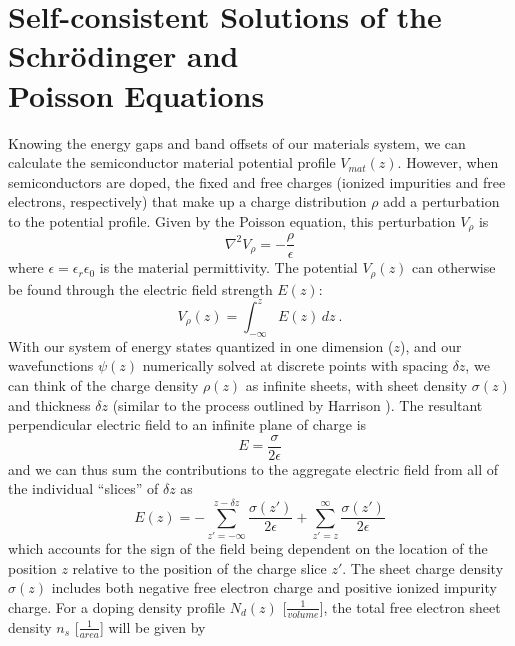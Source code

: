 \documentclass[12pt]{report}
\begin{document}
{\section[Self-consistent Solutions of the Schr\"{o}dinger and Poisson Equations]{Self-consistent Solutions of the Schr\"{o}dinger and \\ Poisson Equations}

Knowing the energy gaps and band offsets of our materials system, we can calculate the semiconductor material potential profile $V_{mat}(z)$. However, when semiconductors are doped, the fixed and free charges (ionized impurities and free electrons, respectively) that make up a charge distribution $\rho$ add a perturbation to the potential profile.  Given by the Poisson equation, this perturbation $V_\rho$ is
\begin{equation}
\nabla^2 V_\rho = -\frac{\rho}{\epsilon}
\end{equation}
where $\epsilon = \epsilon_r \epsilon_0$ is the material permittivity.  The potential $V_\rho(z)$ can otherwise be found through the electric field strength $E(z)$:
\begin{equation}
V_\rho(z)=\int_{-\infty}^z\!E(z)\,dz {~.}
\end{equation}
With our system of energy states quantized in one dimension ($z$), and our wavefunctions $\psi(z)$ numerically solved at discrete points with spacing $\delta\!z$, we can think of the charge density $\rho(z)$ as infinite sheets, with sheet density $\sigma(z)$ and thickness $\delta\!z$ (similar to the process outlined by Harrison \cite{Harrison}).  The resultant perpendicular electric field to an infinite plane of charge is
\begin{equation}
E = \frac{\sigma}{2 \epsilon}
\end{equation}
and we can thus sum the contributions to the aggregate electric field from all of the individual ``slices'' of $\delta\!z$ as
\begin{equation}
E(z) = - \sum_{z'=-\infty}^{z-\delta\!z} \frac{\sigma(z')}{2\epsilon} +  \sum_{z'=z}^{\infty} \frac{\sigma(z')}{2\epsilon}
\end{equation}
which accounts for the sign of the field being dependent on the location of the position $z$ relative to the position of the charge slice $z'$.  The sheet charge density $\sigma(z)$ includes both negative free electron charge and positive ionized impurity charge.  For a doping density profile $N_d(z)$ [$\frac{1}{{volume}}$], the total free electron sheet density $n_s$ [$\frac{1}{{area}}$] will be given by
}
\end{document}
